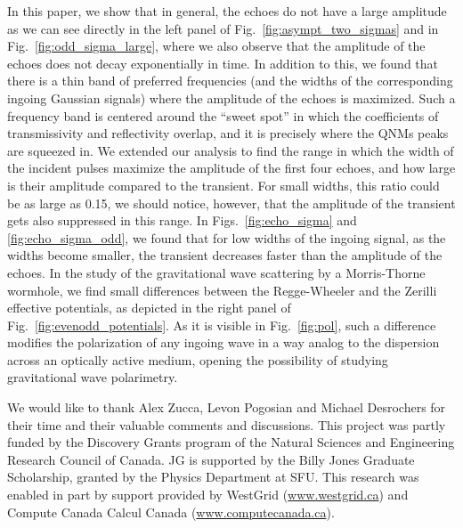 \documentclass[article,aps,nofootinbib,twocolumn,superscriptaddress]{revtex4-1}
\begin{document}
In this paper, we show that in general, the echoes do not have a large amplitude as we can see directly in the left panel of Fig.~\ref{fig:asympt_two_sigmas} and in Fig.~\ref{fig:odd_sigma_large}, where we also observe that the amplitude of the echoes does not decay exponentially in time. In addition to this, we found that there is a thin band of preferred frequencies (and the widths of the corresponding ingoing Gaussian signals) where the amplitude of the echoes is maximized. Such a frequency band is centered around the ``sweet spot'' in which the coefficients of transmissivity and reflectivity overlap, and it is precisely where the QNMs peaks are squeezed in. We extended our analysis to find the range in which the width of the incident pulses maximize the amplitude of the first four echoes, and how large is their amplitude compared to the transient. For small widths, this ratio could be as large as 0.15, we should notice, however, that the amplitude of the transient gets also suppressed in this range. In Figs.~\ref{fig:echo_sigma} and \ref{fig:echo_sigma_odd}, we found that for low widths of the ingoing signal, as the widths become smaller, the transient decreases faster than the amplitude of the echoes. In the study of the gravitational wave scattering by a Morris-Thorne wormhole, we find small differences between the Regge-Wheeler and the Zerilli effective potentials, as depicted in the right panel of Fig.~\ref{fig:evenodd_potentials}. As it is visible in Fig.~\ref{fig:pol}, such a difference modifies the polarization of any ingoing wave in a way analog to the dispersion across an optically active medium, opening the possibility of studying gravitational wave polarimetry.   

\begin{acknowledgments}
We would like to thank Alex Zucca, Levon Pogosian and Michael Desrochers for their time and their valuable comments and discussions. This project was partly funded by the Discovery Grants program of the Natural Sciences and Engineering Research Council of Canada. JG is supported by the Billy Jones Graduate Scholarship, granted by the Physics Department at SFU. This research was enabled in part by support provided by WestGrid (\url{www.westgrid.ca}) and Compute Canada Calcul Canada (\url{www.computecanada.ca}).
\end{acknowledgments}
    

\end{document}

